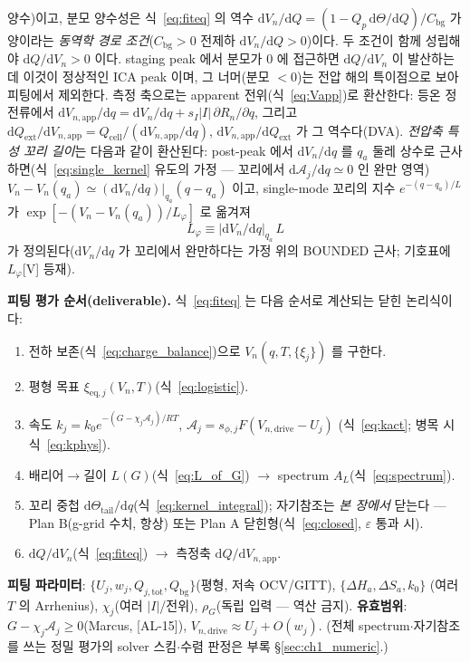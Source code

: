 \documentclass[11pt,a4paper]{article}
\newcommand{\dd}{\mathrm{d}}
\newcommand{\eq}{\mathrm{eq}}
\newcommand{\app}{\mathrm{app}}
\newcommand{\drive}{\mathrm{drive}}
\newcommand{\bg}{\mathrm{bg}}
\newcommand{\cell}{\mathrm{cell}}
\newcommand{\ext}{\mathrm{ext}}
\newcommand{\tot}{\mathrm{tot}}
\newcommand{\AL}[1]{\textsf{[AL-#1]}}
\begin{document}
양수)이고, 분모 양수성은 식~\eqref{eq:fiteq} 의 역수 $\dd V_n/\dd Q=(1-Q_p\,\dd\Theta/\dd Q)/C_\bg$ 가
양이라는 \emph{동역학 경로 조건}($C_\bg>0$ 전제하 $\dd V_n/\dd Q>0$)이다. 두 조건이 함께 성립해야
$\dd Q/\dd V_n>0$ 이다. staging peak 에서 분모가
$0$ 에 접근하면 $\dd Q/\dd V_n$ 이 발산하는데 이것이 정상적인 ICA peak 이며, 그 너머(분모 $<0$)는 전압 해의
특이점으로 보아 피팅에서 제외한다. 측정 축으로는
apparent 전위(식~\eqref{eq:Vapp})로 환산한다: 등온 정전류에서 $\dd V_{n,\app}/\dd q=\dd V_n/\dd q+
s_I|I|\,\partial R_n/\partial q$, 그리고 $\dd Q_\ext/\dd V_{n,\app}=Q_\cell/(\dd V_{n,\app}/\dd q)$,
$\dd V_{n,\app}/\dd Q_\ext$ 가 그 역수다(DVA). \emph{전압축 특성 꼬리 길이}는 다음과 같이 환산된다: post-peak 에서
$\dd V_n/\dd q$ 를 $q_a$ 둘레 상수로 근사하면(식~\eqref{eq:single_kernel} 유도의 가정 — 꼬리에서
$\dd\mathcal A_j/\dd q\simeq0$ 인 완만 영역) $V_n-V_n(q_a)\simeq(\dd V_n/\dd q)|_{q_a}(q-q_a)$ 이고,
single-mode 꼬리의 지수 $e^{-(q-q_a)/L}$ 가 $\exp[-(V_n-V_n(q_a))/L_\varphi]$ 로 옮겨져
\begin{equation}
L_\varphi\equiv\big|\dd V_n/\dd q\big|_{q_a}\,L
\label{eq:Lphi}
\end{equation}
가 정의된다($\dd V_n/\dd q$ 가 꼬리에서 완만하다는 가정 위의 BOUNDED 근사; 기호표에 $L_\varphi$[V] 등재).

\textbf{피팅 평가 순서(deliverable).} 식~\eqref{eq:fiteq} 는 다음 순서로 계산되는 닫힌 논리식이다:
\begin{enumerate}[label=\textbf{S\arabic*.},leftmargin=2.4em]
\item 전하 보존(식~\eqref{eq:charge_balance})으로 $V_n(q,T,\{\xi_j\})$ 를 구한다.
\item 평형 목표 $\xi_{\eq,j}(V_n,T)$(식~\eqref{eq:logistic}).
\item 속도 $k_j=k_0 e^{-(G-\chi_j\mathcal A_j)/RT}$, $\mathcal A_j=s_{\phi,j}F(V_{n,\drive}-U_j)$
  (식~\eqref{eq:kact}; 병목 시 식~\eqref{eq:kphys}).
\item 배리어$\to$길이 $L(G)$(식~\eqref{eq:L_of_G}) $\to$ spectrum $A_L$(식~\eqref{eq:spectrum}).
\item 꼬리 중첩 $\dd\Theta_\mathrm{tail}/\dd q$(식~\eqref{eq:kernel_integral}); 자기참조는 \emph{본 장에서} 닫는다 —
  Plan B(g-grid 수치, 항상) 또는 Plan A 닫힌형(식~\eqref{eq:closed}, $\varepsilon$ 통과 시).
\item $\dd Q/\dd V_n$(식~\eqref{eq:fiteq}) $\to$ 측정축 $\dd Q/\dd V_{n,\app}$.
\end{enumerate}
\textbf{피팅 파라미터}: $\{U_j,w_j,Q_{j,\tot},Q_\bg\}$(평형, 저속 OCV/GITT), $\{\Delta H_a,\Delta S_a,k_0\}$
(여러 $T$ 의 Arrhenius), $\chi_j$(여러 $|I|$/전위), $\rho_G$(독립 입력 — 역산 금지). \textbf{유효범위}:
$G-\chi_j\mathcal A_j\ge0$(Marcus, \AL{15}), $V_{n,\drive}\approx U_j+O(w_j)$. (전체 spectrum$\cdot$자기참조를
쓰는 정밀 평가의 solver 스킴$\cdot$수렴 판정은 부록 \S\ref{sec:ch1_numeric}.)
\end{document}
